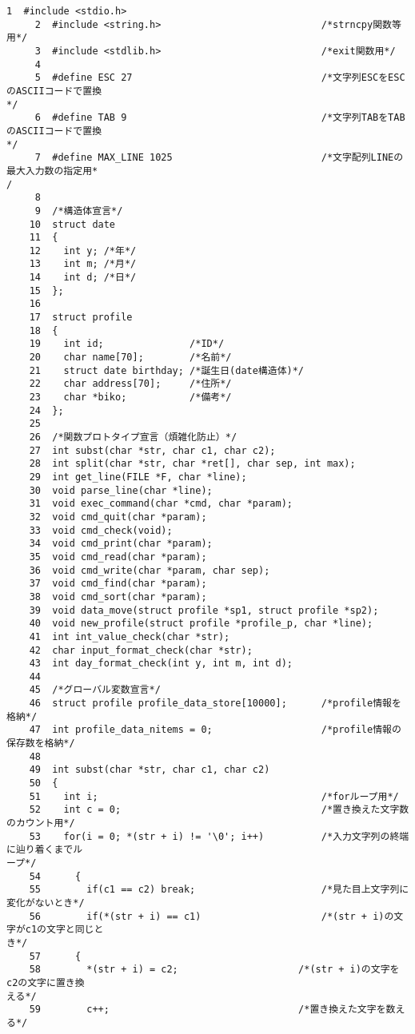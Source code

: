 \begin{Verbatim}[fontsize=\small, baselinestretch=0.8]
     1	#include <stdio.h>
     2	#include <string.h>                            /*strncpy関数等用*/
     3	#include <stdlib.h>                            /*exit関数用*/
     4	
     5	#define ESC 27                                 /*文字列ESCをESCのASCIIコードで置換
*/
     6	#define TAB 9                                  /*文字列TABをTABのASCIIコードで置換
*/
     7	#define MAX_LINE 1025                          /*文字配列LINEの最大入力数の指定用*
/
     8	
     9	/*構造体宣言*/
    10	struct date
    11	{
    12	  int y; /*年*/
    13	  int m; /*月*/
    14	  int d; /*日*/
    15	};
    16	
    17	struct profile
    18	{
    19	  int id;               /*ID*/
    20	  char name[70];        /*名前*/
    21	  struct date birthday; /*誕生日(date構造体)*/
    22	  char address[70];     /*住所*/
    23	  char *biko;           /*備考*/
    24	};
    25	
    26	/*関数プロトタイプ宣言（煩雑化防止）*/
    27	int subst(char *str, char c1, char c2);
    28	int split(char *str, char *ret[], char sep, int max);
    29	int get_line(FILE *F, char *line);
    30	void parse_line(char *line);
    31	void exec_command(char *cmd, char *param);
    32	void cmd_quit(char *param);
    33	void cmd_check(void);
    34	void cmd_print(char *param);
    35	void cmd_read(char *param);
    36	void cmd_write(char *param, char sep);
    37	void cmd_find(char *param);
    38	void cmd_sort(char *param);
    39	void data_move(struct profile *sp1, struct profile *sp2);
    40	void new_profile(struct profile *profile_p, char *line);
    41	int int_value_check(char *str);
    42	char input_format_check(char *str);
    43	int day_format_check(int y, int m, int d);
    44	
    45	/*グローバル変数宣言*/
    46	struct profile profile_data_store[10000];      /*profile情報を格納*/
    47	int profile_data_nitems = 0;                   /*profile情報の保存数を格納*/
    48	
    49	int subst(char *str, char c1, char c2)
    50	{
    51	  int i;                                       /*forループ用*/
    52	  int c = 0;                                   /*置き換えた文字数のカウント用*/
    53	  for(i = 0; *(str + i) != '\0'; i++)          /*入力文字列の終端に辿り着くまでル
ープ*/
    54	    {
    55	      if(c1 == c2) break;                      /*見た目上文字列に変化がないとき*/
    56	      if(*(str + i) == c1)                     /*(str + i)の文字がc1の文字と同じと
き*/
    57		{
    58		  *(str + i) = c2;                     /*(str + i)の文字をc2の文字に置き換
える*/
    59		  c++;                                 /*置き換えた文字を数える*/

\end{Verbatim}
